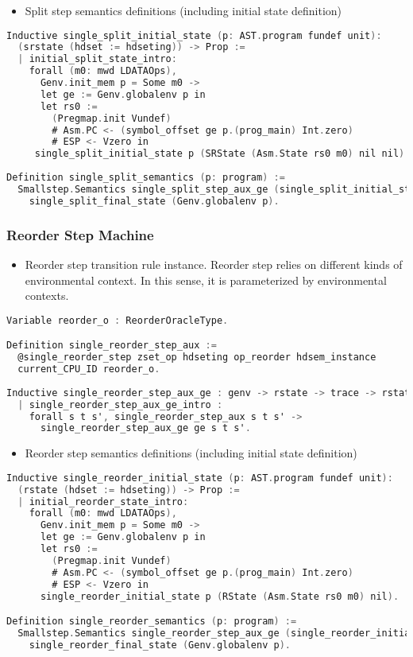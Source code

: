 \begin{itemize}[leftmargin=*]
\item Split step semantics definitions (including initial state definition)
\end{itemize}
\begin{lstlisting}[language=C]
Inductive single_split_initial_state (p: AST.program fundef unit): 
  (srstate (hdset := hdseting)) -> Prop :=
  | initial_split_state_intro: 
    forall (m0: mwd LDATAOps),
      Genv.init_mem p = Some m0 ->
      let ge := Genv.globalenv p in
      let rs0 :=
        (Pregmap.init Vundef)
        # Asm.PC <- (symbol_offset ge p.(prog_main) Int.zero)
        # ESP <- Vzero in
     single_split_initial_state p (SRState (Asm.State rs0 m0) nil nil).
          
Definition single_split_semantics (p: program) :=
  Smallstep.Semantics single_split_step_aux_ge (single_split_initial_state p) 
    single_split_final_state (Genv.globalenv p).
\end{lstlisting}

\subsubsection{Reorder Step Machine}
\begin{itemize}[leftmargin=*]
\item Reorder step transition rule instance. Reorder step relies on different kinds of environmental context. In this sense, 
it is parameterized by environmental contexts.
\end{itemize}
\begin{lstlisting}[language=C]
Variable reorder_o : ReorderOracleType.

Definition single_reorder_step_aux :=
  @single_reorder_step zset_op hdseting op_reorder hdsem_instance 
  current_CPU_ID reorder_o.
  
Inductive single_reorder_step_aux_ge : genv -> rstate -> trace -> rstate -> Prop :=
  | single_reorder_step_aux_ge_intro : 
    forall s t s', single_reorder_step_aux s t s' -> 
      single_reorder_step_aux_ge ge s t s'.  
\end{lstlisting}


\begin{itemize}[leftmargin=*]
\item Reorder step semantics definitions (including initial state definition)
\end{itemize}
\begin{lstlisting}[language=C]
Inductive single_reorder_initial_state (p: AST.program fundef unit): 
  (rstate (hdset := hdseting)) -> Prop :=
  | initial_reorder_state_intro: 
    forall (m0: mwd LDATAOps),
      Genv.init_mem p = Some m0 ->
      let ge := Genv.globalenv p in
      let rs0 :=
        (Pregmap.init Vundef)
        # Asm.PC <- (symbol_offset ge p.(prog_main) Int.zero)
        # ESP <- Vzero in
      single_reorder_initial_state p (RState (Asm.State rs0 m0) nil).

Definition single_reorder_semantics (p: program) :=
  Smallstep.Semantics single_reorder_step_aux_ge (single_reorder_initial_state p) 
    single_reorder_final_state (Genv.globalenv p).
\end{lstlisting}


